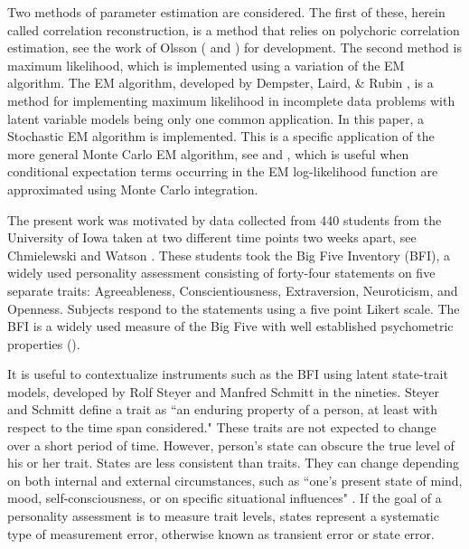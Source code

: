 \documentclass[12pt]{article}
\begin{document}
Two methods of parameter estimation are considered. The first of these, herein called correlation reconstruction, is a method that relies on polychoric
correlation estimation, see the work of Olsson (\cite{Olsson79A} and \cite{Olsson79B}) for development. The second method is maximum likelihood, which is implemented using a variation of the EM algorithm. The EM algorithm, developed by Dempster, Laird, \& Rubin \cite{Dempster77}, is a method for implementing maximum likelihood in incomplete data problems with latent variable models being only one common application. In this paper, a Stochastic EM algorithm \cite{Nielsen00} is implemented. This is a specific application of the more general Monte Carlo EM algorithm, see \cite{Wei90} and \cite{Levine01}, which is useful when conditional expectation terms occurring in the EM log-likelihood function are approximated using Monte Carlo integration. 

The present work was motivated by data collected from 440 students from the
University of Iowa taken at two different time points two weeks apart, see  Chmielewski and Watson \cite{Chmielewski09}. These
students took the Big Five Inventory (BFI), a widely used personality
assessment consisting of forty-four statements on five separate
traits: Agreeableness, Conscientiousness, Extraversion, Neuroticism, and
Openness. Subjects respond to the statements using a five point Likert scale. The BFI is a widely used measure of the Big Five with well established
psychometric properties (\cite{John99}).

It is useful to contextualize instruments such as the BFI using latent
state-trait models, developed by Rolf Steyer and Manfred Schmitt in the
nineties. Steyer and Schmitt \cite{Steyer90} define a trait as ``an enduring
property of a person, at least with respect to the time span considered."
These traits are not expected to change over a short period of time.
However, person's state can obscure the true level of his or her trait.
States are less consistent than traits. They can change depending on both
internal and external circumstances, such as ``one's present state of mind,
mood, self-consciousness, or on specific situational influences" \cite%
{Steyer90}. If the goal of a personality assessment is to measure trait
levels, states represent a systematic type of measurement error, otherwise
known as transient error or state error.
\end{document}
